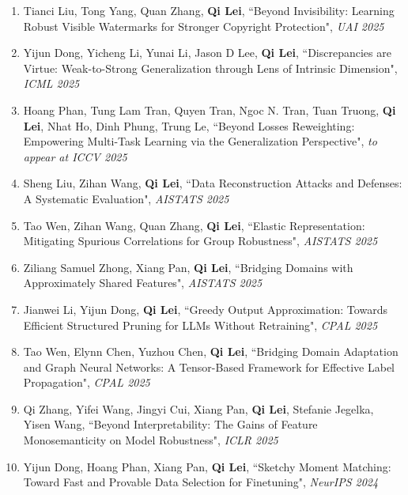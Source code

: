 \documentclass[margin, 10pt]{res} %
\begin{document}
\begin{resume}
\begin{enumerate}
\item{Tianci Liu, Tong Yang, Quan Zhang, \textbf{Qi Lei}, ``Beyond Invisibility: Learning Robust Visible Watermarks for Stronger Copyright Protection", \textit{UAI 2025}}

\item{Yijun Dong, Yicheng Li, Yunai Li, Jason D Lee, \textbf{Qi Lei}, ``Discrepancies are Virtue: Weak-to-Strong Generalization through Lens of Intrinsic Dimension", \textit{ICML 2025}}

\item{Hoang Phan, Tung Lam Tran, Quyen Tran, Ngoc N. Tran, Tuan Truong, \textbf{Qi Lei}, Nhat Ho, Dinh Phung, Trung Le, ``Beyond Losses Reweighting: Empowering Multi-Task Learning via the Generalization Perspective", \textit{to appear at ICCV 2025}}	

	
\item{Sheng Liu, Zihan Wang, \textbf{Qi Lei}, ``Data Reconstruction Attacks and Defenses: A Systematic Evaluation", \textit{AISTATS 2025}} 
	
\item{Tao Wen, Zihan Wang, Quan Zhang, \textbf{Qi Lei}, ``Elastic Representation: Mitigating Spurious Correlations for Group Robustness", \textit{AISTATS 2025} }
	
\item{Ziliang Samuel Zhong, Xiang Pan, \textbf{Qi Lei}, ``Bridging Domains with Approximately Shared Features", \textit{AISTATS 2025} }
	
\item{Jianwei Li, Yijun Dong, \textbf{Qi Lei}, ``Greedy Output Approximation: Towards Efficient Structured Pruning for LLMs Without Retraining", \textit{CPAL 2025} }
	
\item{Tao Wen, Elynn Chen, Yuzhou Chen, \textbf{Qi Lei}, ``Bridging Domain Adaptation and Graph Neural Networks: A Tensor-Based Framework for Effective Label Propagation", \textit{CPAL 2025} }
	
\item{Qi Zhang, Yifei Wang, Jingyi Cui, Xiang Pan, \textbf{Qi Lei}, Stefanie Jegelka, Yisen Wang, ``Beyond Interpretability: The Gains of Feature Monosemanticity on Model Robustness", \textit{ICLR 2025}}
	
	
	
\item{Yijun Dong, Hoang Phan, Xiang Pan, \textbf{Qi Lei}, ``Sketchy Moment Matching: Toward Fast and Provable Data Selection for Finetuning", \textit{NeurIPS 2024} }
	

\end{enumerate}
\end{resume}
\end{document}
